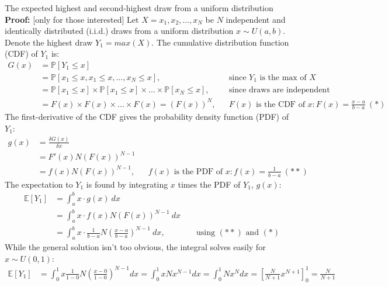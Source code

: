 \begin{frame}{The expected highest and second-highest draw from a uniform distribution}
    \textbf{Proof:} [only for those interested] Let $X=x_1,x_2,...,x_N$ be $N$ independent and identically distributed (i.i.d.) draws from a uniform distribution $x\sim U(a, b)$. Denote the highest draw $Y_1=max(X)$. The cumulative distribution function (CDF) of $Y_1$ is: \vspace{-6pt}
    \begin{align*}
      G(x)&=\mathbb{P}[Y_1\leq x]\\
          &=\mathbb{P}[x_1\leq x,x_1\leq x,...,x_N\leq x],&&\text{since $Y_1$ is the max of }X\\
          &=\mathbb{P}[x_1\leq x]\times\mathbb{P}[x_1\leq x]\times...\times\mathbb{P}[x_N\leq x],&&\text{since draws are independent}\\
          &=F(x)\times F(x)\times...\times F(x)=(F(x))^N,&&F(x)\text{ is the CDF of }x:F(x)=\frac{x-a}{b-a}\ (*)
    \end{align*}
    The first-derivative of the CDF gives the probability density function (PDF) of $Y_1$: \vspace{-6pt}
    \begin{align*}
      g(x)&=\frac{\delta G(x)}{\delta x}\\
          &= F'(x)N(F(x))^{N-1}\\
          &= f(x)N(F(x))^{N-1},&&f(x)\text{ is the PDF of }x:f(x)=\frac{1}{b-a}\ (**)
    \end{align*}
    The expectation to $Y_1$ is found by integrating $x$ times the PDF of $Y_1$, $g(x)$: \vspace{-6pt}
    \begin{align*}
      \mathbb{E}[Y_1]&=\textstyle\int_a^b x\cdot g(x)\ dx\\
                     &=\textstyle\int_a^b x\cdot f(x)N(F(x))^{N-1}\ dx\\
                     &=\textstyle\int_a^b x\cdot \frac{1}{b-a}N\left(\frac{x-a}{b-a}\right)^{N-1}\ dx,&&\text{ using }(**)\text{ and }(*)
    \end{align*}
    While the general solution isn't too obvious, the integral solves easily for $x\sim U(0, 1)$: \vspace{-5pt}
    \begin{align*}
      \mathbb{E}[Y_1]&=\textstyle\int_0^1 x  \frac{1}{1-0}N\left(\frac{x-0}{1-0}\right)^{N-1} dx
      =\textstyle\int_0^1 x N x^{N-1} dx
      =\textstyle\int_0^1 N x^N dx
      =\left[\frac{N}{N+1} x^{N+1}\right]_0^1 = \frac{N}{N+1}
    \end{align*}
    \vfill\null
\end{frame}
